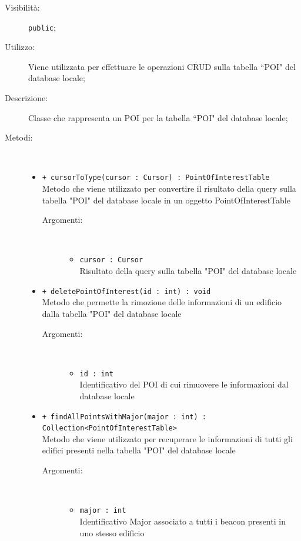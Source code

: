 \documentclass[../DefinizioneDiProdotto.tex]{subfiles}
\begin{document}
\begin{description}
\begin{itemize}
\end{itemize}
\item[Visibilità:] \texttt{public};
\item[Utilizzo:] Viene utilizzata per effettuare le operazioni CRUD sulla tabella “POI" del database locale;
\item[Descrizione:] Classe che rappresenta un POI per la tabella “POI" del database locale;
\item[Metodi:] \
\begin{itemize}
\item \texttt{+ cursorToType(cursor : Cursor) : PointOfInterestTable}\\
Metodo che viene utilizzato per convertire il risultato della query sulla tabella "POI" del database locale in un oggetto PointOfInterestTable
 \begin{description}
\item[Argomenti:] \
\begin{itemize}
\item \texttt{cursor : Cursor}\\
Risultato della query sulla tabella "POI" del database locale\end{itemize}
\end{description}
\item \texttt{+ deletePointOfInterest(id : int) : void}\\
Metodo che permette la rimozione delle informazioni di un edificio dalla tabella "POI" del database locale 
 \begin{description}
\item[Argomenti:] \
\begin{itemize}
\item \texttt{id : int}\\
Identificativo del POI di cui rimuovere le informazioni dal database locale\end{itemize}
\end{description}
\item \texttt{+ findAllPointsWithMajor(major : int) : Collection<PointOfInterestTable>}\\
Metodo che viene utilizzato per recuperare le informazioni di tutti gli edifici presenti nella tabella "POI" del database locale
 \begin{description}
\item[Argomenti:] \
\begin{itemize}
\item \texttt{major : int}\\
Identificativo Major associato a tutti i beacon presenti in uno stesso edificio\end{itemize}

\end{description}
\end{itemize}
\end{description}
\end{document}

